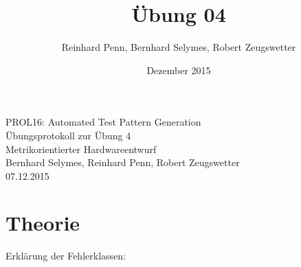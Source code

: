 \documentclass[12pt,a4paper]{article}
\begin{document}
\title{Übung 04}
\author{Reinhard Penn, Bernhard Selymes, Robert Zeugswetter}
\date{Dezember 2015}

\normalsize



\newcommand{\Uebung}{ATPG}
\newcommand{\srcpath}{../../src}
\newcommand{\simpath}{../../sim}
\newcommand{\synpath}{../../syn}



\begin{center}
PROL16: Automated Test Pattern Generation\\
Übungsprotokoll zur Übung 4\\
Metrikorientierter Hardwareentwurf\\
Bernhard Selymes, Reinhard Penn, Robert Zeugswetter\\
07.12.2015
\end{center}

\section{Theorie}

Erklärung der Fehlerklassen:
\end{document}
